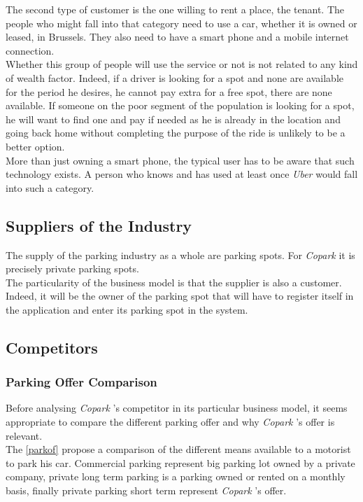 \documentclass[12pt,a4paper,oneside]{book}
\newcommand{\bp}{\textit{Copark }}
\begin{document}
The second type of customer is the one willing to rent a place, the tenant. The people who might fall into that category need to use a car, whether it is owned or leased, in Brussels. They also need to have a smart phone and a mobile internet connection.\\
Whether this group of people will use the service or not is not related to any kind of wealth factor. Indeed, if a driver is looking for a spot and none are available for the period he desires, he cannot pay extra for a free spot, there are none available. If someone on the poor segment of the population is looking for a spot, he will want to find one and pay if needed as he is already in the location and going back home without completing the purpose of the ride is unlikely to be a better option.\\
More than just owning a smart phone, the typical user has to be aware that such technology exists. A person who knows and has used at least once \textit{Uber} would fall into such a category.

\subsection{Suppliers of the Industry}
The supply of the parking industry as a whole are parking spots. For \bp it is precisely private parking spots.\\
The particularity of the business model is that the supplier is also a customer. Indeed, it will be the owner of the parking spot that will have to register itself in the application and enter its parking spot in the system.

\subsection{Competitors}
\subsubsection{Parking Offer Comparison}
\label{poc}
Before analysing \bp 's competitor in its particular business model, it seems appropriate to compare the different parking offer and why \bp 's offer is relevant.\\

The \autoref{parkof} propose a comparison of the different means available to a motorist to park his car. Commercial parking represent big parking lot owned by a private company, private long term parking is a parking owned or rented on a monthly basis, finally private parking short term represent \bp 's offer.
\end{document}
